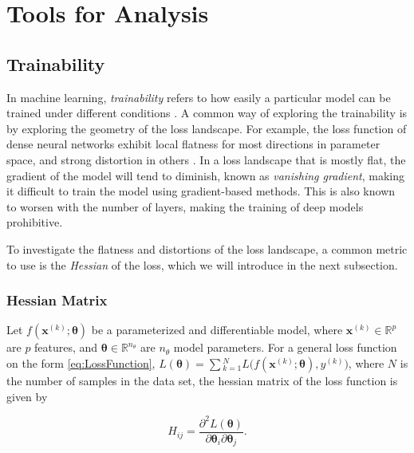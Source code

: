 \chapter{Tools for Analysis}\label{chap:TfA}



\section{Trainability}\label{sec:Trainability}
In machine learning, \emph{trainability} refers to how easily a particular model can be trained under different conditions \cite{abbas2020power}. A common way of exploring the trainability is by exploring the geometry of the loss landscape. For example, the loss function of dense neural networks exhibit local flatness for most directions in parameter space, and strong distortion in others \cite{karakida2019universal}. In a loss landscape that is mostly flat, the gradient of the model will tend to diminish, known as \emph{vanishing gradient}, making it difficult to train the model using gradient-based methods. This is also known to worsen with the number of layers, making the training of deep models prohibitive.

To investigate the flatness and distortions of the loss landscape, a common metric to use is the \emph{Hessian} of the loss, which we will introduce in the next subsection. 
\subsection{Hessian Matrix}\label{sec:HessianMatrix}
Let $f(\boldsymbol{x}^{(k)}; \boldsymbol{\theta})$ be a parameterized and differentiable model, where $\boldsymbol{x}^{(k)} \in \mathbb{R}^p$ are $p$ features, and $\boldsymbol{\theta} \in \mathbb{R}^{n_\theta}$ are $n_{\theta}$ model parameters. For a general loss function on the form \autoref{eq:LossFunction}, $L(\boldsymbol{\theta}) = \sum{_{k=1}^{N}L(f(\boldsymbol{x}^{(k)};\boldsymbol{\theta}), y^{(k)}})$, where $N$ is the number of samples in the data set, the hessian matrix of the loss function is given by

\begin{equation}
\label{eq:Hessian}
    H_{ij} = \frac{\partial^2 L(\boldsymbol{\theta})}{\partial \boldsymbol{\theta}_i\partial \boldsymbol{\theta}_j}.
\end{equation}

